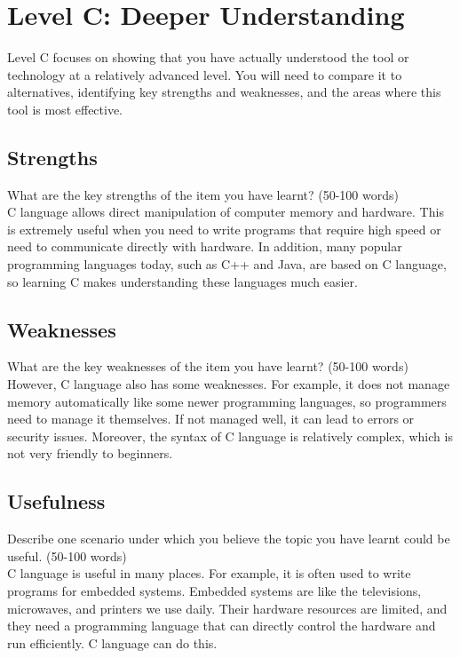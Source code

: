\documentclass[a4paper, 11pt]{report}
\begin{document}

\newpage
\section{Level C: Deeper Understanding}

Level C focuses on showing that you have actually understood the tool or technology at a relatively advanced level. You will need to compare it to alternatives, identifying key strengths and weaknesses, and the areas where this tool is most effective. 

\subsection{Strengths}
What are the key strengths of the item you have learnt? (50-100 words)\\

C language allows direct manipulation of computer memory and hardware. This is extremely useful when you need to write programs that require high speed or need to communicate directly with hardware. In addition, many popular programming languages today, such as C++ and Java, are based on C language, so learning C makes understanding these languages much easier.\\

\subsection{Weaknesses}
What are the key weaknesses of the item you have learnt? (50-100 words)\\

However, C language also has some weaknesses. For example, it does not manage memory automatically like some newer programming languages, so programmers need to manage it themselves. If not managed well, it can lead to errors or security issues. Moreover, the syntax of C language is relatively complex, which is not very friendly to beginners.\\

\subsection{Usefulness}
Describe one scenario under which you believe the topic you have learnt could be useful. (50-100 words)\\

C language is useful in many places. For example, it is often used to write programs for embedded systems. Embedded systems are like the televisions, microwaves, and printers we use daily. Their hardware resources are limited, and they need a programming language that can directly control the hardware and run efficiently. C language can do this.\\
\end{document}
